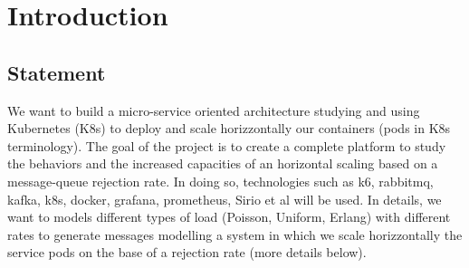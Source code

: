 \section{Introduction}
 

\subsection{Statement}

We want to build a micro-service oriented architecture studying and using Kubernetes (K8s) to deploy and scale horizzontally our containers (pods in K8s terminology). The goal of the project is to create a complete platform to study the behaviors and the increased capacities of an horizontal scaling based on a message-queue rejection rate. In doing so, technologies such as k6, rabbitmq, kafka, k8s, docker, grafana, prometheus, Sirio et al will be used. In details, we want to models different types of load (Poisson, Uniform, Erlang) with different rates to generate messages modelling a system in which we scale horizzontally the service pods on the base of a rejection rate (more details below). 

